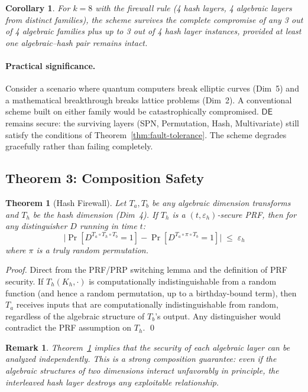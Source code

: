 \documentclass[11pt]{article}
\newtheorem{theorem}{Theorem}
\newtheorem{corollary}{Corollary}
\newtheorem{remark}{Remark}
\newcommand{\DE}{\textsf{DE}}
\begin{document}
\begin{corollary}
For $k = 8$ with the firewall rule (4 hash layers, 4 algebraic layers
from distinct families), the scheme survives the complete compromise of
any 3 out of 4 algebraic families plus up to 3 out of 4 hash layer
instances, provided at least one algebraic--hash pair remains intact.
\end{corollary}

\paragraph{Practical significance.}
Consider a scenario where quantum computers break elliptic curves (Dim~5)
and a mathematical breakthrough breaks lattice problems (Dim~2). A
conventional scheme built on either family would be catastrophically
compromised. $\DE$ remains secure: the surviving layers (SPN, Permutation,
Hash, Multivariate) still satisfy the conditions of
Theorem~\ref{thm:fault-tolerance}. The scheme degrades gracefully rather
than failing completely.

\subsection{Theorem 3: Composition Safety}

\begin{theorem}[Hash Firewall]
\label{thm:composition}
Let $T_a, T_b$ be any algebraic dimension transforms and $T_h$ be the
hash dimension (Dim~4). If $T_h$ is a $(t, \varepsilon_h)$-secure PRF,
then for any distinguisher $D$ running in time $t$:
\[
\bigl|\Pr[D^{T_a \circ T_h \circ T_b} = 1] - \Pr[D^{T_a \circ \pi \circ T_b} = 1]\bigr| \;\leq\; \varepsilon_h
\]
where $\pi$ is a truly random permutation.
\end{theorem}

\begin{proof}
Direct from the PRF/PRP switching lemma and the definition of PRF security.
If $T_h(K_h, \cdot)$ is computationally indistinguishable from a random
function (and hence a random permutation, up to a birthday-bound term),
then $T_a$ receives inputs that are computationally indistinguishable from
random, regardless of the algebraic structure of $T_b$'s output. Any
distinguisher would contradict the PRF assumption on $T_h$. \qed
\end{proof}

\begin{remark}
Theorem~\ref{thm:composition} implies that the security of each algebraic
layer can be analyzed \emph{independently}. This is a strong composition
guarantee: even if the algebraic structures of two dimensions interact
unfavorably in principle, the interleaved hash layer destroys any
exploitable relationship.
\end{remark}
\end{document}
